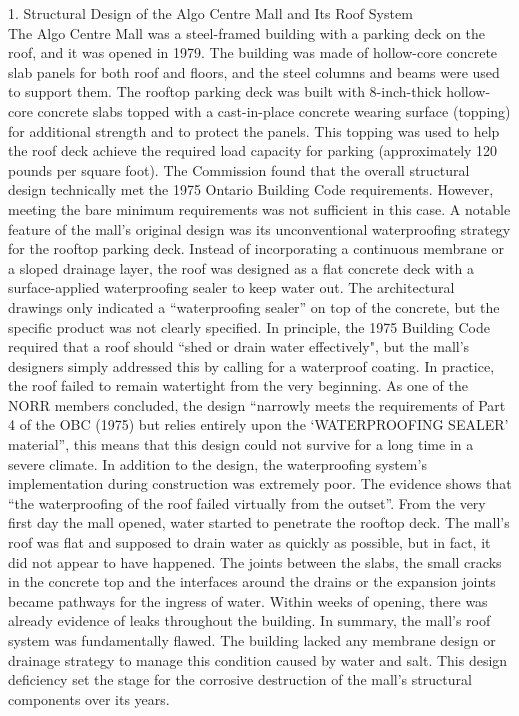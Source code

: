 \documentclass[12pt]{article}
\begin{document}
1. Structural Design of the Algo Centre Mall and Its Roof System \\
The Algo Centre Mall was a steel-framed building with a parking deck on the roof, and it was opened in 1979. The building was made of hollow-core concrete slab panels for both roof and floors, and the steel columns and beams were used to support them. The rooftop parking deck was built with 8-inch-thick hollow-core concrete slabs topped with a cast-in-place concrete wearing surface (topping) for additional strength and to protect the panels. This topping was used to help the roof deck achieve the required load capacity for parking (approximately 120 pounds per square foot). The Commission found that the overall structural design technically met the 1975 Ontario Building Code requirements. However, meeting the bare minimum requirements was not sufficient in this case.
A notable feature of the mall’s original design was its unconventional waterproofing strategy for the rooftop parking deck. Instead of incorporating a continuous membrane or a sloped drainage layer, the roof was designed as a flat concrete deck with a surface-applied waterproofing sealer to keep water out. The architectural drawings only indicated a “waterproofing sealer” on top of the concrete, but the specific product was not clearly specified. In principle, the 1975 Building Code required that a roof should “shed or drain water effectively", but the mall’s designers simply addressed this by calling for a waterproof coating. In practice, the roof failed to remain watertight from the very beginning. As one of the NORR members concluded, the design “narrowly meets the requirements of Part 4 of the OBC (1975) but relies entirely upon the ‘WATERPROOFING SEALER’ material”, this means that this design could not survive for a long time in a severe climate.
In addition to the design,  the waterproofing system's implementation during construction was extremely poor. The evidence shows that “the waterproofing of the roof failed virtually from the outset”. From the very first day the mall opened, water started to penetrate the rooftop deck. The mall’s roof was flat and supposed to drain water as quickly as possible, but in fact, it did not appear to have happened. The joints between the slabs, the small cracks in the concrete top and the interfaces around the drains or the expansion joints became pathways for the ingress of water. Within weeks of opening, there was already evidence of leaks throughout the building. In summary, the mall’s roof system was fundamentally flawed. The building lacked any membrane design or drainage strategy to manage this condition caused by water and salt. This design deficiency set the stage for the corrosive destruction of the mall’s structural components over its years.
\end{document}
